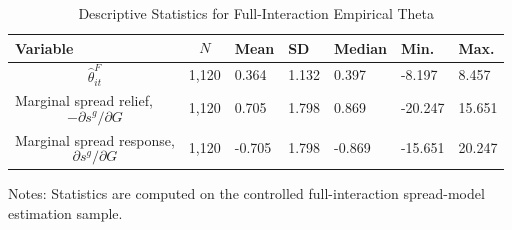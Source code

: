 \begin{table}[H]\centering
\begin{threeparttable}
\caption{Descriptive Statistics for Full-Interaction Empirical Theta}
\label{tab:theta_descriptive_stats}
\scriptsize
\begin{tabularx}{\textwidth}{lYYYYYY}
\toprule
Variable & $$N$$ & Mean & SD & Median & Min. & Max. \\
\midrule
$$\widehat{\theta}^{F}_{it}$$ & 1,120 & 0.364 & 1.132 & 0.397 & -8.197 & 8.457 \\
Marginal spread relief, $$-\partial s^g/\partial G$$ & 1,120 & 0.705 & 1.798 & 0.869 & -20.247 & 15.651 \\
Marginal spread response, $$\partial s^g/\partial G$$ & 1,120 & -0.705 & 1.798 & -0.869 & -15.651 & 20.247 \\
\bottomrule
\end{tabularx}
\begin{tablenotes}[flushleft]\footnotesize
\item Notes: Statistics are computed on the controlled full-interaction spread-model estimation sample.
\end{tablenotes}
\end{threeparttable}
\end{table}
